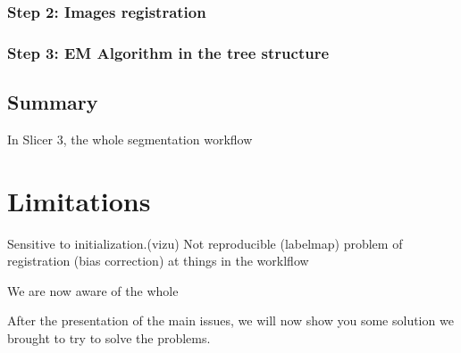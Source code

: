 %
\subsubsection{Step 2: Images registration}

%
\subsubsection{Step 3: EM Algorithm in the tree structure}
%
\subsection{Summary}
In Slicer 3, the whole segmentation workflow

%
\section{Limitations}
Sensitive to initialization.(vizu)
Not reproducible (labelmap)
problem of registration (bias correction)
at things in the worklflow


%
\par
We are now aware of the whole 
\par
After the presentation of the main issues, we will now show you some solution we brought to try to solve the problems.

